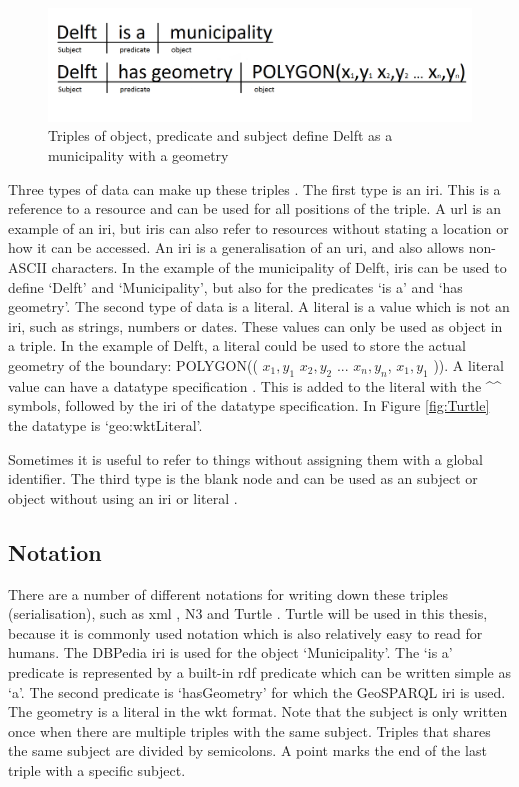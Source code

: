 \begin{figure}
	\centering
	\includegraphics[width=0.7\linewidth]{figs/Triples.png}
	\caption{Triples of object, predicate and subject define Delft as a municipality with a geometry}
	\label{fig:Triples}
\end{figure}

Three types of data can make up these triples \citep{LD:W3C6}. The first type is an \ac{iri}. This is a reference to a resource and can be used for all positions of the triple. A \ac{url} is an example of an \ac{iri}, but \ac{iri}s can also refer to resources without stating a location or how it can be accessed. An \ac{iri} is a generalisation of an \ac{uri}, and also allows non-ASCII characters. In the example of the municipality of Delft, \ac{iri}s can be used to define `Delft' and `Municipality', but also for the predicates `is a' and `has geometry'. The second type of data is a literal. A literal is a value which is not an \ac{iri}, such as strings, numbers or dates. These values can only be used as object in a triple. In the example of Delft, a literal could be used to store the actual geometry of the boundary: POLYGON(( $x_{1},y_{1}$ $x_{2},y_{2}$ ... $x_{n},y_{n}$, $x_{1},y_{1}$ )). A literal value can have a datatype specification \citep{LD:W3C7}. This is added to the literal with the \^{}\^{} symbols, followed by the \ac{iri} of the datatype specification. In Figure \ref{fig:Turtle} the datatype is `geo:wktLiteral'.

Sometimes it is useful to refer to things without assigning them with a global identifier. The third type is the blank node and can be used as an subject or object without using an \ac{iri} or literal \citep{LD:W3C6}.  

\subsection{Notation}
There are a number of different notations for writing down these triples (serialisation), such as \ac{xml} \citep{LD:W3C3}, N3 \citep{LD:W3C5} and Turtle \citep{LD:W3C4}. Turtle will be used in this thesis, because it is commonly used notation which is also relatively easy to read for humans. The DBPedia \ac{iri} is used for the object `Municipality'. The `is a' predicate is represented by a built-in \ac{rdf} predicate which can be written simple as `a'. The second predicate is `hasGeometry' for which the GeoSPARQL \ac{iri} is used. The geometry is a literal in the \ac{wkt} format. Note that the subject is only written once when there are multiple triples with the same subject. Triples that shares the same subject are divided by semicolons. A point marks the end of the last triple with a specific subject.

